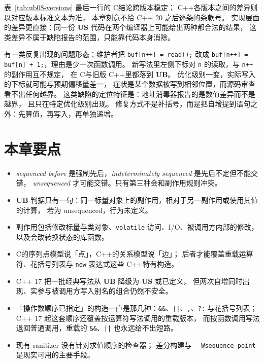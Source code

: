 \documentclass[12pt,a4paper,fontset=fandol]{ctexbook}
\newcommand{\Tp}[1]{\texttt{#1}}
\newcommand{\Opt}[1]{\texttt{-\/-#1}}
\newcommand{\Lang}[1]{\textsf{#1}}
\newcommand{\CL}{\Lang{C}}
\newcommand{\CPP}{\Lang{C++}}
\newcommand{\UB}{\textbf{\textsf{UB}}}
\newcommand{\USB}{\textbf{\textsf{US}}}
\begin{document}
表~\ref{tab:ub08-versions} 最后一行的 \CL 结论跨版本稳定；
\CPP 各版本之间的差异则以对应版本标准文本为准，
本章刻意不给 \CPP{} 20 之后逐条的条款号。
实现层面的差异更直接：同一份 \USB{} 代码在两个编译器上可能给出两种都合法的结果，
这类差异不属于缺陷报告的范围，只能靠代码本身消除。

\begin{casebox}[title={「只改了一个括号」的事故形态}]
有一类反复出现的问题形态：维护者把 \Tp{buf[n++] = read();}
改成 \Tp{buf[n++] = buf[n] + 1;}，理由是少一次函数调用。
新写法里左侧下标对 \Tp{n} 的读取，与 \Tp{n++} 的副作用互不规定，
在 \CL 与旧版 \CPP 里都落到 \UB{}。
优化级别一变，实际写入的下标就可能与预期偏移量差一，
症状是某个数据被写到相邻位置，而源码审查看不出任何越界。
这类缺陷的定位特征是：地址消毒器报告的是数值差异而不是越界，
且只在特定优化级别出现。
修复方式不是补括号，而是把自增提到语句之外：先算值，再写入，再单独递增。
\end{casebox}

\section{本章要点}\label{sec:ub08-summary}

\begin{itemize}
\item \emph{sequenced before} 是强制先后，\emph{indeterminately sequenced} 是先后不定但不能交错，
      \emph{unsequenced} 才可能交错。只有第三种会和副作用规则冲突。
\item \UB{} 判据只有一句：同一标量对象上的副作用，相对于另一副作用或使用其值的计算，
      若为 unsequenced，行为未定义。
\item 副作用包括修改标量与类对象、\Tp{volatile} 访问、I/O、被调用方内部的修改，
      以及会改转换状态的库函数。
\item \CL 的序列点模型说「点」，\CPP 的关系模型说「边」；
      后者才能覆盖重载运算符、花括号列表与 \Tp{new} 表达式这些 \CPP 特有构造。
\item \CPP{} 17 把一批经典写法从 \UB{} 降级为 \USB{} 或已定义，
      但两次自增同时出现、实参与被调用方写入别名的组合仍然不安全。
\item 「操作数顺序已指定」的构造一直是那几种：\Tp{\&\&}、\Tp{||}、\Tp{,}、\Tp{?:}
      与花括号列表；\CPP{} 17 起这套顺序还覆盖按运算符写法调用的重载版本，
      而按函数调用写法退回普通调用，重载的 \Tp{\&\&}、\Tp{||} 也永远给不出短路。
\item 现有 sanitizer 没有针对求值顺序的检查器；
      差分构建与 \Opt{Wsequence-point} 是现实可用的主要手段。
\end{itemize}
\end{document}
